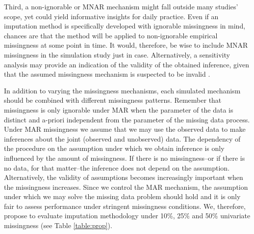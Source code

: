 \documentclass[bimj,fleqn]{w-art}
\begin{document}
Third, a non-ignorable or MNAR mechanism might fall outside many studies' scope, yet could yield informative insights for daily practice. Even if an imputation method is specifically developed with ignorable missingness in mind, chances are that the method will be applied to non-ignorable empirical missingness at some point in time. It would, therefore, be wise to include MNAR missingness in the simulation study just in case. Alternatively, a sensitivity analysis may provide an indication of the validity of the obtained inference, given that the assumed missingness mechanism is suspected to be invalid \citep[see e.g.][part 5]{molenberghs2014handbook}.

In addition to varying the missingness mechanisms, each simulated mechanism should be combined with different missingness patterns. Remember that missingness is only ignorable under MAR when the parameter of the data is distinct and a-priori independent from the parameter of the missing data process. Under MAR missingness we assume that we may use the observed data to make inferences about the joint (observed and unobserved) data. The dependency of the procedure on the assumption under which we obtain inference is only influenced by the amount of missingness. If there is no missingness--or if there is no data, for that matter--the inference does not depend on the assumption. Alternatively, the validity of assumptions becomes increasingly important when the missingness increases. Since we control the MAR mechanism, the assumption under which we may solve the missing data problem should hold and it is only fair to assess performance under stringent missingness conditions. We, therefore, propose to evaluate imputation methodology under 10\%, 25\% and 50\% univariate missingness (see Table \ref{table:prop}). 
\end{document}
